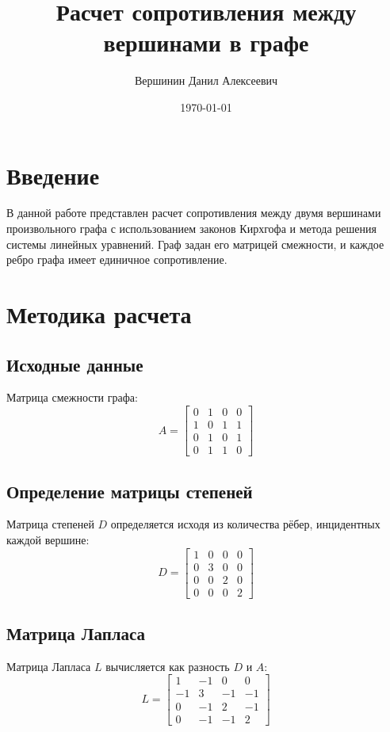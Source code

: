 \documentclass[14pt]{article}
\title{Расчет сопротивления между вершинами в графе}
\author{Вершинин Данил Алексеевич }
\date{\today}
\begin{document}
	
	\maketitle
	
	\section{Введение}
	В данной работе представлен расчет сопротивления между двумя вершинами произвольного графа с использованием законов Кирхгофа и метода решения системы линейных уравнений. Граф задан его матрицей смежности, и каждое ребро графа имеет единичное сопротивление.
	
	\section{Методика расчета}
	
	\subsection{Исходные данные}
	Матрица смежности графа:
	\[
	A = \begin{bmatrix}
		0 & 1 & 0 & 0 \\
		1 & 0 & 1 & 1 \\
		0 & 1 & 0 & 1 \\
		0 & 1 & 1 & 0
	\end{bmatrix}
	\]
	
	\subsection{Определение матрицы степеней}
	Матрица степеней \(D\) определяется исходя из количества рёбер, инцидентных каждой вершине:
	\[
	D = \begin{bmatrix}
		1 & 0 & 0 & 0 \\
		0 & 3 & 0 & 0 \\
		0 & 0 & 2 & 0 \\
		0 & 0 & 0 & 2
	\end{bmatrix}
	\]
	
	\subsection{Матрица Лапласа}
	Матрица Лапласа \(L\) вычисляется как разность \(D\) и \(A\):
	\[
	L = \begin{bmatrix}
		1 & -1 & 0 & 0 \\
		-1 & 3 & -1 & -1 \\
		0 & -1 & 2 & -1 \\
		0 & -1 & -1 & 2
	\end{bmatrix}
	\]
	
\end{document}
